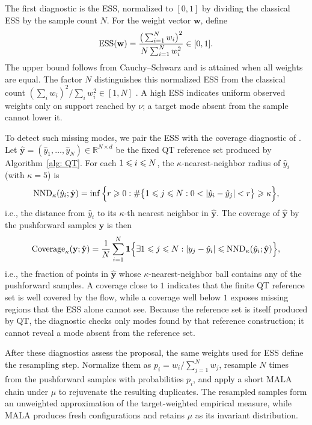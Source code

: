 \documentclass{article}
\begin{document}
The first diagnostic is the ESS, normalized to $[0,1]$ by dividing the classical ESS by the sample count $N$. For the weight vector $\mathbf w$, define
\begin{equation}
    \mathrm{ESS}(\mathbf w) = \frac{\big(\sum_{i=1}^{N} w_i\big)^2}{N \sum_{i=1}^{N} w_i^2} \in [0,1].
    \label{eq: ESS}
\end{equation}
The upper bound follows from Cauchy--Schwarz and is attained when all weights are equal. The factor $N$ distinguishes this normalized ESS from the classical count $(\sum_iw_i)^2/\sum_iw_i^2\in[1,N]$ \citep{martino2017rethinking}. A high ESS indicates uniform observed weights only on support reached by $\nu$; a target mode absent from the sample cannot lower it.

To detect such missing modes, we pair the ESS with the coverage diagnostic of \citet{naeem2020reliable}. Let $\hat{\mathbf y} = (\hat y_1,\dots,\hat y_N) \in \mathbb R^{N\times d}$ be the fixed QT reference set produced by Algorithm~\ref{alg: QT}. For each $1 \leqslant i \leqslant N$, the $\kappa$-nearest-neighbor radius of $\hat y_i$ (with $\kappa = 5$) is
\begin{equation}
    \mathrm{NND}_\kappa(\hat y_i;\hat{\mathbf y}) = \inf\Big\{ r \geqslant 0 :
    \# \big\{1\leqslant j \leqslant N: 0 < |\hat y_i - \hat y_j| < r\big\} \geqslant \kappa
    \Big\},
\end{equation}
i.e., the distance from $\hat y_i$ to its $\kappa$-th nearest neighbor in $\hat{\mathbf y}$. The coverage of $\hat{\mathbf y}$ by the pushforward samples $\mathbf y$ is then
\begin{equation}
    \mathrm{Coverage}_\kappa(\mathbf y;\hat{\mathbf y}) =
    \frac{1}{N} \sum_{i=1}^{N} \mathbf 1\Bigl\{
        \exists  1\leqslant j\leqslant N : |y_j - \hat y_i| \leqslant \mathrm{NND}_\kappa(\hat y_i;\hat{\mathbf y})
    \Bigr\},
\end{equation}
i.e., the fraction of points in $\hat{\mathbf y}$ whose $\kappa$-nearest-neighbor ball contains any of the pushforward samples. A coverage close to $1$ indicates that the finite QT reference set is well covered by the flow, while a coverage well below $1$ exposes missing regions that the ESS alone cannot see. Because the reference set is itself produced by QT, the diagnostic checks only modes found by that reference construction; it cannot reveal a mode absent from the reference set.

After these diagnostics assess the proposal, the same weights used for ESS define the resampling step. Normalize them as $p_i=w_i/\sum_{j=1}^{N}w_j$, resample $N$ times from the pushforward samples with probabilities $p_i$, and apply a short MALA chain under $\mu$ to rejuvenate the resulting duplicates. The resampled samples form an unweighted approximation of the target-weighted empirical measure, while MALA produces fresh configurations and retains $\mu$ as its invariant distribution.
\end{document}

